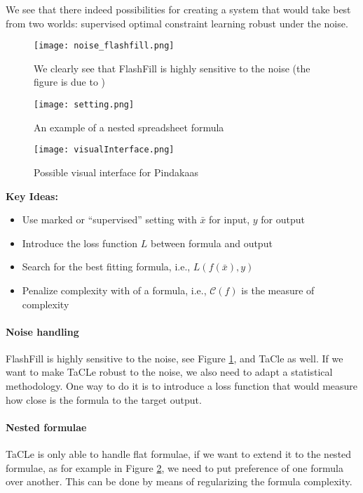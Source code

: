 We see that there indeed possibilities for creating a system that
would take best from two worlds: supervised optimal constraint
learning robust under the noise.

\begin{figure}[htb]
 \centering
 \texttt{[image: noise\_flashfill.png]}
 \caption{We clearly see that FlashFill is highly sensitive to the
   noise (the figure is due to \cite{robustfill})}
  \label{fig:flashfill_noise}
\end{figure}

\begin{figure}[htb]
 \centering
 \texttt{[image: setting.png]}
 \caption{An example of a nested spreadsheet formula}
  \label{fig:nested_formula}
\end{figure}

\begin{figure}[htb]
 \centering
 \texttt{[image: visualInterface.png]}
 \caption{Possible visual interface for Pindakaas}
  \label{fig:visual_interface}
\end{figure}

\textbf{Key Ideas:}
  \begin{itemize}
    \item Use marked or ``supervised'' setting with $\bar x$ for input, $y$ for output
    \item Introduce the loss function $L$ between formula and output
    \item Search for the best fitting formula, i.e., $L(f(\bar x),y)$
    \item Penalize complexity with of a formula, i.e., $\mathcal{C}(f)$ is the measure of complexity
  \end{itemize}




\paragraph{Noise handling} FlashFill is highly sensitive to the noise,
see Figure \ref{fig:flashfill_noise},
and TaCle as well. If we want to make TaCLe robust to the noise, we also need to adapt a
statistical methodology. One way to do it is to introduce a loss
function that would measure how close is the formula to the target
output.

\paragraph{Nested formulae} TaCLe is only able to handle flat
formulae, if we want to extend it to the nested formulae, as for
example in Figure \ref{fig:nested_formula}, we need to
put preference of one formula over another. This can be done by means
of regularizing the formula complexity.


